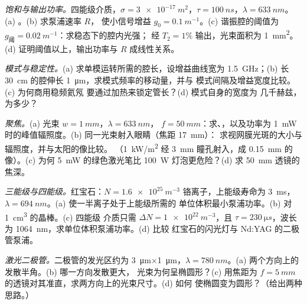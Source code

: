 \begin{exercise}[$\star\star$]\label{exo:b2:laser:6}
\emph{饱和与输出功率。}四能级介质，$\sigma =
\qty{3e-17}{m^2}$，$\tau = \qty{100}{ns}$，$\lambda = \qty{633}{nm}$。
(a) 。(b) 求泵浦速率 $R$，
使小信号增益 $g_0 = \qty{0.1}{m^{-1}}$。(c) 谐振腔的阈值为
$g_{\text{阈}} = \qty{0.02}{m^{-1}}$：求稳态下的腔内光强；
经 $T_2 = 1\%$ 输出，光束面积为 \qty{1}{mm^2}。
(d) 证明阈值以上，输出功率与 $R$ 成线性关系。
\end{exercise}

\begin{exercise}[$\star\star$]\label{exo:b2:laser:7}
\emph{模式与稳定性。}(a) 求单模运转所需的腔长，设增益曲线宽为
\qty{1.5}{GHz}；(b) 长 \qty{30}{cm} 的腔伸长
\qty{1}{\micro m}，求模式频率的移动量，并与
模式间隔及增益宽度比较。(c) 为何商用稳频氦氖
要通过加热来锁定管长？(d) 模式自身的宽度为
几千赫兹，为多少？
\end{exercise}

\begin{exercise}[$\star\star$]\label{exo:b2:laser:8}
\emph{聚焦。}(a) 光束 $w = \qty{1}{mm}$，$\lambda = \qty{633}{nm}$，
$f = \qty{50}{mm}$：求、，以及功率为
\qty{1}{mW} 时的峰值辐照度。(b) 同一光束射入眼睛（焦距 \qty{17}{mm}）：
求视网膜光斑的大小与辐照度，并与太阳的像比较。
（\qty{1}{kW/m^2} 经 \qty{3}{mm} 瞳孔射入，成 \qty{0.15}{mm}
的像）。(c) 为何 \qty{5}{mW} 的绿色激光笔比
\qty{100}{W} 灯泡更危险？(d) 求 \qty{50}{mm} 透镜的焦深。
\end{exercise}

\begin{exercise}[$\star\star$]\label{exo:b2:laser:9}
\emph{三能级与四能级。}红宝石：$N = \qty{1.6e25}{m^{-3}}$
铬离子，上能级寿命为 \qty{3}{ms}，$\lambda =
\qty{694}{nm}$。(a) 使一半离子处于上能级所需的
单位体积最小泵浦功率。(b) 对 \qty{1}{cm^3} 的晶棒。(c) 四能级
介质只需 $\Delta N = \qty{1e22}{m^{-3}}$，且 $\tau =
\qty{230}{\micro s}$，波长为 \qty{1064}{nm}，求单位体积泵浦功率。(d) 比较
红宝石的闪光灯与 Nd:YAG 的二极管泵浦。
\end{exercise}

\begin{exercise}[$\star\star\star$]\label{exo:b2:laser:10}
\emph{激光二极管。}二极管的发光区约为
\qty{3}{\micro m}×\qty{1}{\micro m}，$\lambda = \qty{780}{nm}$。(a)
两个方向上的发散半角。(b) 哪一方向发散更大，
光束为何呈椭圆形？(c) 用焦距为 $f =
\qty{5}{mm}$ 的透镜对其准直，求两方向上的光束尺寸。(d) 如何
使椭圆变为圆形？（给出两种思路。）
\end{exercise}

